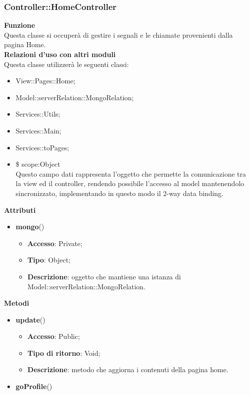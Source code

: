 {\subsubsection{Controller::HomeController}{
	\label{sub:homecontroller}
	\textbf{Funzione}\\
	\indent Questa classe si occuperà di gestire i segnali e le chiamate provenienti dalla pagina Home.\\
	\textbf{Relazioni d'uso con altri moduli}\\
	\indent Questa classe utilizzerà le seguenti classi:
	\begin{itemize}
		\item View::Pages::Home;
		\item Model::\-serverRelation::\-MongoRelation;
		\item Services::Utils;
		\item Services::Main;
		\item Services::toPages;
		\item \$ scope:Object\\
			\indent Questo campo dati rappresenta l’oggetto che permette la comunicazione tra la view ed il controller, rendendo possibile l’accesso al model mantenendolo sincronizzato, implementando in questo modo il 2-way data binding.
	\end{itemize}
	\textbf{Attributi}\\
	\begin{itemize}
		\item \textbf{mongo}()
		\begin{itemize}
			\item \textbf{Accesso}: Private;
			\item \textbf{Tipo}: Object;
			\item \textbf{Descrizione}: oggetto che mantiene una istanza di Model::\-serverRelation::\-MongoRelation.
		\end{itemize}
    \end{itemize}
	\textbf{Metodi}
	\begin{itemize}
		\item \textbf{update}()
		\begin{itemize}
			\item \textbf{Accesso}: Public;
			\item \textbf{Tipo di ritorno}: Void;
			\item \textbf{Descrizione}: metodo che aggiorna i contenuti della pagina home.
		\end{itemize}
		\item \textbf{goProfile}()

\end{itemize}}}
